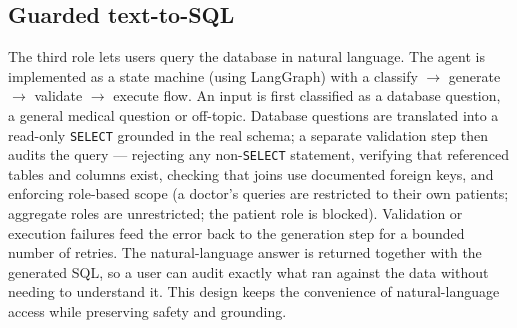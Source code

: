 \subsection{Guarded text-to-SQL}
The third role lets users query the database in natural language. The agent is
implemented as a state machine (using LangGraph) with a
classify $\rightarrow$ generate $\rightarrow$ validate $\rightarrow$ execute
flow. An input is first classified as a database question, a general medical
question or off-topic. Database questions are translated into a read-only
\texttt{SELECT} grounded in the real schema; a separate validation step then
audits the query --- rejecting any non-\texttt{SELECT} statement, verifying that
referenced tables and columns exist, checking that joins use documented foreign
keys, and enforcing role-based scope (a doctor's queries are restricted to their
own patients; aggregate roles are unrestricted; the patient role is blocked).
Validation or execution failures feed the error back to the generation step for a
bounded number of retries. The natural-language answer is returned together with
the generated SQL, so a user can audit exactly what ran against the data without
needing to understand it. This design keeps the convenience of natural-language
access while preserving safety and grounding.
